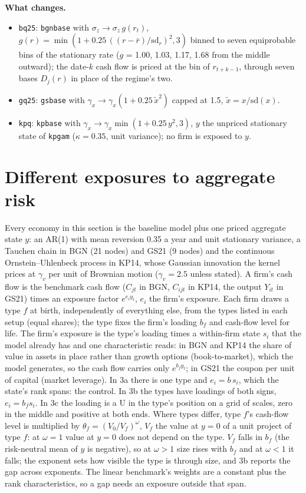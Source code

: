 \documentclass[11pt]{article}
\begin{document}
\noindent\textbf{What changes.} 
\begin{itemize}
  \item \texttt{bq25}: \texttt{bgnbase} with $\sigma_z \to \sigma_z\,g(r_t)$, $g(r)=\min(1 + 0.25\,((r-\bar r)/\mathrm{sd}_r)^2, 3)$ binned to seven equiprobable bins of the stationary rate ($g$ = 1.00, 1.03, 1.17, 1.68 from the middle outward); the date-$k$ cash flow is priced at the bin of $r_{t+k-1}$, through seven bases $D_j(r)$ in place of the regime's two.
  \item \texttt{gq25}: \texttt{gsbase} with $\gamma_x \to \gamma_x(1 + 0.25\,\tilde x^2)$ capped at 1.5, $\tilde x = x/\mathrm{sd}(x)$.
  \item \texttt{kpq}: \texttt{kpbase} with $\gamma_x \to \gamma_x \min(1 + 0.25\,y^2, 3)$, $y$ the unpriced stationary state of \texttt{kpgam} ($\kappa=0.35$, unit variance); no firm is exposed to $y$.
\end{itemize}


\section{Different exposures to aggregate risk}

Every economy in this section is the baseline model plus one priced aggregate state $y$: an AR(1) with mean reversion 0.35 a year and unit stationary variance, a Tauchen chain in BGN (21 nodes) and GS21 (9 nodes) and the continuous Ornstein--Uhlenbeck process in KP14, whose Gaussian innovation the kernel prices at $\gamma_v$ per unit of Brownian motion ($\gamma_v = 2.5$ unless stated). A firm's cash flow is the benchmark cash flow ($C_{jt}$ in BGN, $C_{ijt}$ in KP14, the output $Y_{it}$ in GS21) times an exposure factor $e^{e_i y_t}$, $e_i$ the firm's exposure. Each firm draws a type $f$ at birth, independently of everything else, from the types listed in each setup (equal shares); the type fixes the firm's loading $b_f$ and cash-flow level for life. The firm's exposure is the type's loading times a within-firm state $s_i$ that the model already has and one characteristic reads: in BGN and KP14 the share of value in assets in place rather than growth options (book-to-market), which the model generates, so the cash flow carries only $e^{b_f y_t}$; in GS21 the coupon per unit of capital (market leverage). In 3a there is one type and $e_i = b\,s_i$, which the state's rank spans: the control. In 3b the types have loadings of both signs, $e_i = b_f s_i$. In 3c the loading is a U in the type's position on a grid of scales, zero in the middle and positive at both ends. Where types differ, type $f$'s cash-flow level is multiplied by $\theta_f = (V_0/V_f)^{\omega}$, $V_f$ the value at $y = 0$ of a unit project of type $f$: at $\omega = 1$ value at $y = 0$ does not depend on the type. $V_f$ falls in $b_f$ (the risk-neutral mean of $y$ is negative), so at $\omega > 1$ size rises with $b_f$ and at $\omega < 1$ it falls; the exponent sets how visible the type is through size, and 3b reports the gap across exponents. The linear benchmark's weights are a constant plus the rank characteristics, so a gap needs an exposure outside that span.
\end{document}
